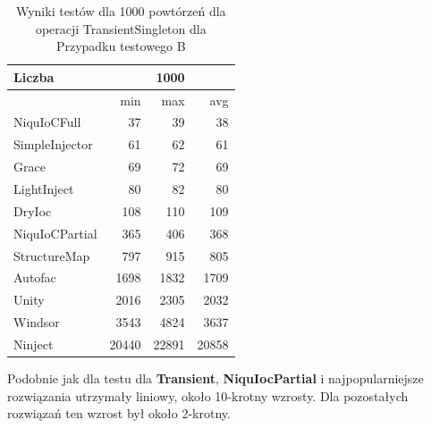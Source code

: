 \documentclass[12pt]{article}
\begin{document}
\begin{table}[H]
\captionsetup{belowskip=0pt,aboveskip=0pt}
\begin{center}
\begin{small}
	\begin{tabular}{ | l | r r r | }
    		\hline
Liczba & & 1000 & \\ \hline
 & min & max & avg \\ \hline
NiquIoCFull & 37 & 39 & 38 \\ \hline
SimpleInjector & 61 & 62 & 61 \\ \hline
Grace & 69 & 72 & 69 \\ \hline
LightInject & 80 & 82 & 80 \\ \hline
DryIoc & 108 & 110 & 109 \\ \hline
NiquIoCPartial & 365 & 406 & 368 \\ \hline
StructureMap & 797 & 915 & 805 \\ \hline
Autofac & 1698 & 1832 & 1709 \\ \hline
Unity & 2016 & 2305 & 2032 \\ \hline
Windsor & 3543 & 4824 & 3637 \\ \hline
Ninject & 20440 & 22891 & 20858 \\ \hline
  	\end{tabular}
\end{small}
\end{center}
\caption{Wyniki testów dla 1000 powtórzeń dla operacji TransientSingleton dla Przypadku testowego B}
\label{TestCaseB_TransientSingleton1000}
\end{table}
Podobnie jak dla testu dla \textbf{Transient}, \textbf{NiquIocPartial} i najpopularniejsze rozwiązania utrzymały liniowy, około 10-krotny wzrosty. Dla pozostałych rozwiązań ten wzrost był około 2-krotny.
\end{document}
